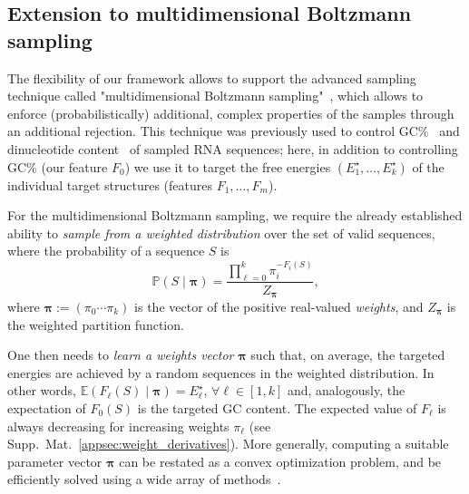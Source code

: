 \documentclass[]{bmcart}
\newcommand{\val}{\bar S} %
\newcommand{\partfun}[1]{Z_{#1}}
\newcommand{\F}{\mathcal{F}}
\newcommand{\Def}[1]{\emph{#1}}
\newcommand{\TargetE}{E^{\star}}
\newcommand{\Nuc}[1]{{\sf #1}}
\newcommand{\Cb}{\Nuc{C}}
\newcommand{\Gb}{\Nuc{G}}
\newcommand{\GCb}{\Gb\Cb}
\newcommand{\citep}[1]{\cite{#1}}
\begin{document}
\subsection*{Extension to multidimensional Boltzmann sampling}\label{sec:multiBoltzmann}
The flexibility of our framework allows to support the advanced sampling technique called "multidimensional Boltzmann sampling"~\citep{Bodini2010}, which allows to enforce (probabilistically)  additional, complex properties of the samples through an additional rejection.
This technique was previously used to control \GCb\%~\citep{Waldispuehl2011,Reinharz2013} and dinucleotide content~\citep{Zhang2013} of sampled RNA sequences; here, in addition to controlling \GCb\% (our feature $F_0$) we use it to target the free energies $(\TargetE_1,\ldots,\TargetE_k)$ of the individual target structures (features $F_1,\dots,F_m$).

For the multidimensional Boltzmann sampling, we require the already established ability to \Def{sample from a weighted distribution} over the set of valid sequences, where the probability of a sequence $S$ is
$$\mathbb{P}(S\mid \pmb{\pi}) = \frac{\prod_{\ell=0}^{k} \pi_i^{-F_i(S)}}{\partfun{\pmb{\pi}}},$$
where $\pmb{\pi}:=(\pi_0\cdots\pi_k)$ is the vector of the positive real-valued \Def{weights}, and $\partfun{\pmb{\pi}}$ is the weighted partition function.


One then needs to \Def{learn a weights vector} $\pmb{\pi}$ such that, on average, the targeted energies are achieved by a random sequences in the weighted distribution. In other words,  $\mathbb{E}(F_\ell(S)\mid \pmb{\pi})=\TargetE_\ell$,  $\forall\ell\in[1,k]$ and, analogously, the expectation of $F_0(S)$ is the targeted GC content.
The expected value of $F_\ell$ is always decreasing for increasing weights $\pi_\ell$ (see Supp.\ Mat.~\ref{appsec:weight_derivatives}). More generally, computing a suitable parameter vector $\pmb{\pi}$ can be restated as a convex optimization problem, and be efficiently solved using a wide array of methods~\citep{Denise2010,Bendkowski2017}.
\end{document}
